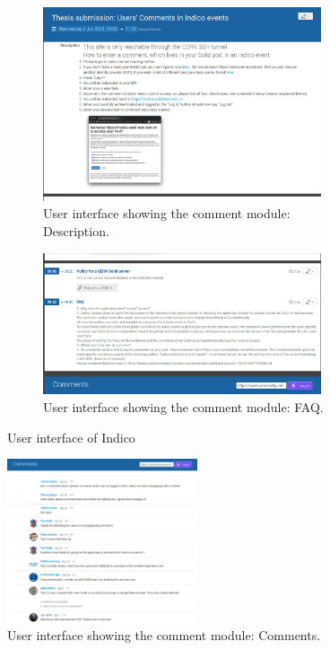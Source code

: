 \begin{figure}
    \centering
    \begin{subfigure}{.5\textwidth}
      \centering
        \includegraphics[width=0.9\textwidth]{prototype/poc-solid-comment-description.png}
        \caption{User interface showing the comment module: Description.}
        \label{fig:poc-solid-comment-description}
    \end{subfigure}%
    \begin{subfigure}{.5\textwidth}
      \centering
    \includegraphics[width=0.9\textwidth]{prototype/poc-solid-comment-agenda.png}
    \caption{User interface showing the comment module: FAQ.}
    \label{fig:poc-solid-comment-agenda}
    \end{subfigure}
    \caption{User interface of Indico}
    \label{fig:test}
\end{figure}

\begin{figure}[ht!]
    \centering
    \includegraphics[width=0.5\textwidth]{prototype/poc-solid-comment-comments.png}
    \caption{User interface showing the comment module: Comments.}
    \label{fig:poc-solid-comment-comments}
\end{figure}

